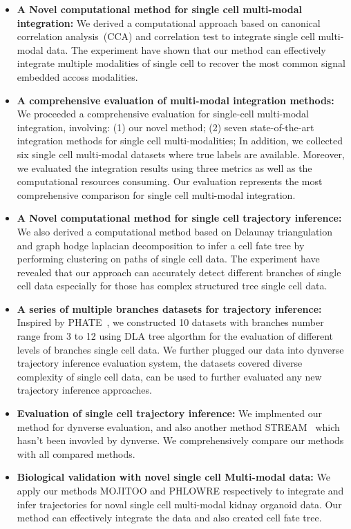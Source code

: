 \begin{itemize}
	\item \textbf{A Novel computational method for single cell multi-modal integration:} We derived a computational approach based on canonical correlation analysis~(CCA) and correlation test to integrate single cell multi-modal data. The experiment have shown that our method can effectively integrate multiple modalities of single cell to recover the most common signal embedded accoss modalities.

	\item \textbf{A comprehensive evaluation of multi-modal integration methods:} We proceeded a comprehensive evaluation for single-cell multi-modal integration, involving: (1) our novel method; (2) seven state-of-the-art integration methods for single cell multi-modalities; In addition, we collected six single cell multi-modal datasets where true labels are available. Moreover, we evaluated the integration results using three metrics as well as the computational resources consuming. Our evaluation represents the most comprehensive comparison for single cell multi-modal integration.

	\item \textbf{A Novel computational method for single cell trajectory inference:} We also derived a computational method based on Delaunay triangulation and graph hodge laplacian decomposition to infer a cell fate tree by performing clustering on paths of single cell data. The experiment have revealed that our approach can accurately detect different branches of single cell data especially for those has complex structured tree single cell data.

	\item \textbf{A series of multiple branches datasets for trajectory inference:} Inspired by PHATE~\citep{moon2017phate}, we constructed 10 datasets with branches number range from 3 to 12 using DLA tree algorthm for the evaluation of different levels of branches single cell data. We further plugged our data into dynverse trajectory inference evaluation system, the datasets covered diverse complexity of single cell data, can be used to further evaluated any new trajectory inference approaches.

	\item \textbf{Evaluation of single cell trajectory inference:} We implmented our method for dynverse evaluation, and also another method STREAM~\citep{chen2019stream} which hasn't been invovled by dynverse. We comprehensively compare our methods with all compared methods.

	\item \textbf{Biological validation with novel single cell Multi-modal data:} We apply our methods MOJITOO and PHLOWRE respectively to integrate and infer trajectories for noval single cell multi-modal kidnay organoid data. Our method can effectively integrate the data and also created cell fate tree.
\end{itemize}


